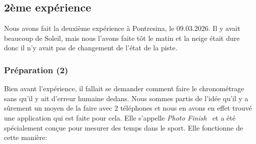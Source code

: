 \documentclass{article}
\begin{document}
\subsection{2ème expérience}

Nous avons fait la deuxième expérience à Pontresina, le 09.03.2026. Il y avait beaucoup de Soleil, mais nous l'avons faite tôt le matin et la neige était dure donc il n'y avait pas de changement de l'état de la piste.

\subsubsection{Préparation (2)}

Bien avant l'expérience, il fallait se demander comment faire le chronométrage sans qu'il y ait d'erreur humaine dedans. Nous sommes partis de l'idée qu'il y a sûrement un moyen de la faire avec $2$ téléphones et nous en avons en effet trouvé une application qui est faite pour cela. 
\newline Elle s'appelle \textit{Photo Finish}~\cite{photofinish} et a été spécialement conçue pour mesurer des temps dans le sport. Elle fonctionne de cette manière:
\vspace{0.3cm}
\end{document}

